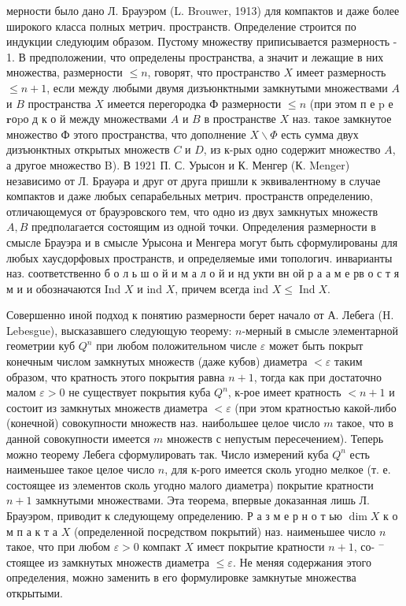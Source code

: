 \documentclass[10pt]{article}
\begin{document}
мерности было дано Л. Брауэром (L. Brouwer, 1913) для компактов и даже более широкого класса полных метрич. пространств. Определение строится по индукции следуюџим образом. Пустому множеству приписывается размерность - 1. В предположении, что определены пространства, а значит и лежащие в них множества, размерности $\leqslant n$, говорят, что пространство $X$ имеет размерность $\leqslant n+1$, если между любыми двумя дизъюнктными замкнутыми множествами $A$ и $B$ пространства $X$ имеется перегородка Ф размерности $\leqslant n$ (при этом п е $\mathrm{p}$ е $\mathbf{r} о \mathrm{p} о$ д к о й между множествами $A$ и $B$ в пространстве $X$ наз. такое замкнутое множество Ф этого пространства, что дополнение $X \backslash \Phi$ есть сумма двух дизъюнктных открытых множеств $C$ и $D$, из к-рых одно содержит множество $A$, а другое множество B). В 1921 П. С. Урысон и К. Менгер (К. Menger) независимо от Л. Брауәра и друг от друга пришли к эквивалентному в случае компактов и даже любых сепарабельных метрич. пространств определению, отличающемуся от брауэровского тем, что одно из двух замкнутых множеств $A, B$ предполагается состоящим из одной точки. Определения размерности в смысле Брауэра и в смысле Урысона и Менгера могут быть сформулированы для любых хаусдорфовых пространств, и определяемые ими топологич. инварианты наз. соответственно б о л ь ш о й и м а л о й и нд укти вн ой р а $а$ м е рв о с т я м и и обозначаются Ind $X$ и ind $X$, причем всегда ind $X \leqslant \operatorname{Ind} X$.



Совершенно иной подход к понятию размерности берет начало от А. Лебега (H. Lebesgue), высказавшего следующую теорему: $n$-мерный в смысле элементарной геометрии куб $Q^{n}$ при любом положительном числе $\varepsilon$ может быть покрыт конечным числом замкнутых множеств (даже кубов) диаметра $<\varepsilon$ таким образом, что кратность этого покрытия равна $n+1$, тогда как при достаточно малом $\varepsilon>0$ не существует покрытия куба $Q^{n}$, к-рое имеет кратность $<n+1$ и состоит из замкнутых множеств диаметра $<\varepsilon$ (при этом кратностью какой-либо (конечной) совокупности множеств наз. наибольшее целое число $m$ такое, что в данной совокупности имеется $m$ множеств с непустым пересечением). Теперь можно теорему Лебега сформулировать так. Число измерений куба $Q^{n}$ есть наименьшее такое целое число $n$, для к-рого имеется сколь угодно мелкое (т. е. состоящее из элементов сколь угодно малого диаметра) покрытие кратности $n+1$ замкнутыми множествами. Эта теорема, впервые доказанная лишь Л. Брауэром, приводит к следующему определению. Р а з м е р н о т ью $\operatorname{dim} X$ к о м п а к т а $X$ (определенной посредством покрытий) наз. наименьшее число $n$ такое, что при любом $\varepsilon>0$ компакт $X$ имеєт покрытие кратности $n+1$, со- $^{-}$ стоящее из замкнутых множеств диаметра $\leqslant \varepsilon$. Не меняя содержания этого определения, можно заменить в его формулировке замкнутые множества открытыми.
\end{document}
